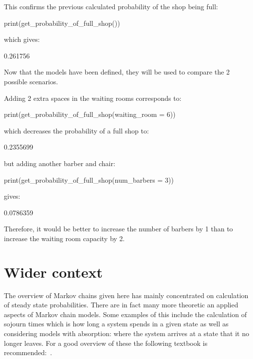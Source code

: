 This confirms the previous calculated probability of the shop
being full:

\begin{Rin}
print(get_probability_of_full_shop())
\end{Rin}

which gives:

\begin{Rout}
[1] 0.261756
\end{Rout}

Now that the models have been defined, they will be used to compare the 2
possible scenarios.

Adding 2 extra spaces in the waiting rooms corresponds to:

\begin{Rin}
print(get_probability_of_full_shop(waiting_room = 6))
\end{Rin}

which decreases the probability of a full shop to:

\begin{Rout}
[1] 0.2355699
\end{Rout}

but adding another barber and chair:

\begin{Rin}
print(get_probability_of_full_shop(num_barbers = 3))
\end{Rin}

gives:

\begin{Rout}
[1] 0.0786359
\end{Rout}

Therefore, it would be better to increase the number of barbers by 1
than to increase the waiting room capacity by 2.


\section{Wider context}\label{sec:markov_chains_wider_context}

The overview of Markov chains given here has mainly concentrated on calculation
of steady state probabilities. There are in fact many more theoretic an applied
aspects of Markov chain models. Some examples of this include the calculation of
sojourn times which is how long a system spends in a given state as well as
considering models with absorption: where the system arrives at a state that it
no longer leaves. For a good overview of
these the following textbook is recommended:~\cite{stewart2009probability}.

